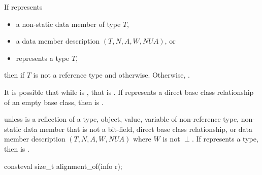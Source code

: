 \begin{itemdescr}
\pnum
\returns
If  represents
\begin{itemize}
\item a non-static data member of type $T$,
\item a data member description $(T, N, A, W, \mathit{NUA})$, or
\item {} represents a type $T$,
\end{itemize}
then  if $T$ is not a reference type
and  otherwise.
Otherwise, .
\begin{note}
It is possible that while 
is ,
that 
is .
If  represents a direct base class relationship of an empty base class,
then  is .
\end{note}

\pnum
\throws
{} unless
 is a reflection of a
type,
object,
value,
variable of non-reference type,
non-static data member that is not a bit-field,
direct base class relationship, or
data member description $(T, N, A, W, \mathit{NUA})$
where $W$ is not $\perp$.
If  represents a type,
then  is .
\end{itemdescr}

%
\begin{itemdecl}
consteval size_t alignment_of(info r);
\end{itemdecl}

